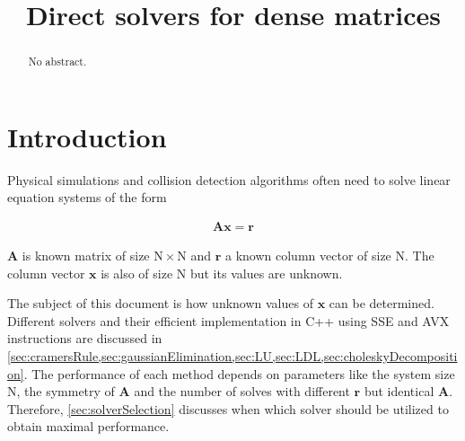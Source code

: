 \documentclass[fontsize = 10pt,DIV = 13]{scrartcl}
\title{Direct solvers for dense matrices}
\begin{document}
\maketitle

\begin{abstract}
No abstract.
\end{abstract}

\section{Introduction}

Physical simulations and collision detection algorithms often need to solve linear equation systems of the form

\begin{align}
\label{eq:linearSystem}
\mathbf{A}\mathbf{x}=\mathbf{r}
\end{align}

$\mathbf{A}$ is known matrix of size $\mathrm{N}\times\mathrm{N}$ and $\mathbf{r}$ a known column vector of size $\mathrm{N}$.
The column vector $\mathbf{x}$ is also of size $\mathrm{N}$ but its values are unknown.

 


The subject of this document is how  unknown values of $\mathbf{x}$ can be determined. 
Different solvers and their efficient implementation in C++ using SSE and AVX instructions are discussed in \cref{sec:cramersRule,sec:gaussianElimination,sec:LU,sec:LDL,sec:choleskyDecomposition}.
The performance of each method depends on parameters like the system size $\mathrm{N}$, the symmetry of $\mathbf{A}$ and the number of solves with different $\mathbf{r}$ but identical $\mathbf{A}$.
Therefore, \cref{sec:solverSelection} discusses when which solver should be utilized to obtain maximal performance.
\end{document}
